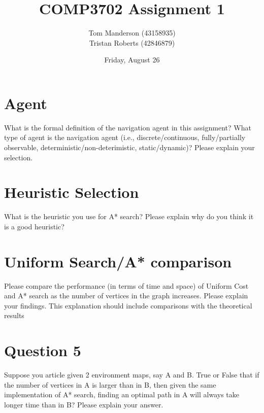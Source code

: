\documentclass[11pt,a4paper]{article}
\title{COMP3702 Assignment 1}
\author{
Tom Manderson (43158935)
\\
Tristan Roberts (42846879)
}
\date{Friday, August 26}
\begin{document}
\maketitle
\tableofcontents
\clearpage

\section{Agent}
What is the formal definition of the navigation agent in this assignment? What type of agent is the navigation agent (i.e., discrete/continuous, fully/partially observable, deterministic/non-deterimistic, static/dynamic)? Please explain your selection.


\section{Heuristic Selection}
What is the heuristic you use for A* search? Please explain why do you think it is a good heuristic?


\section{Uniform Search/A* comparison}
Please compare the performance (in terms of time and space) of Uniform Cost and A* search as the number of vertices in the graph increases. Please explain your findings. This explanation should include comparisons with the theoretical results


\section{Question 5}
Suppose you article given 2 environment maps, say A and B. True or False that if the number of vertices in A is larger than in B, then given the same implementation of A* search, finding an optimal path in A will always take longer time than in B? Please explain your answer.
\end{document}
